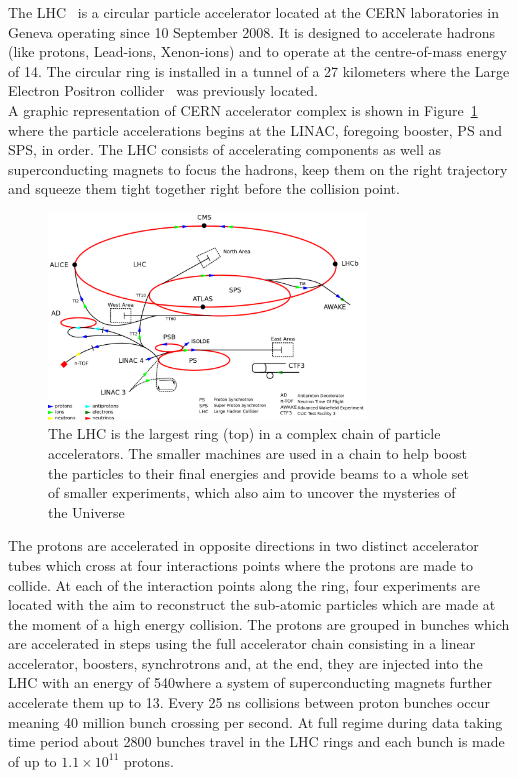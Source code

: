 The LHC~\cite{Brning2004LHCDR} is a circular particle accelerator
located at the CERN laboratories in Geneva operating since 10
September 2008. It is
designed to accelerate hadrons (like protons, Lead-ions, Xenon-ions) and to
operate at the centre-of-mass energy of 14\TeV.
The circular ring is installed in a tunnel of a 27 kilometers where
the Large Electron Positron collider~\cite{Lep:designReport} was
previously located.\\
A graphic representation of CERN accelerator
complex is shown in Figure~\ref{fig:cern} where the particle
accelerations begins at the LINAC, foregoing booster, PS and SPS, in
order. The LHC consists of accelerating components as well as
superconducting magnets to focus the hadrons, keep them on the right
trajectory and squeeze them tight together right before the
collision point. 

\begin{figure}[h]
\centering
\includegraphics[width=0.75\textwidth]{Figures/c2/Cern-accelerator-complex.png}
\vspace*{3mm}
\caption{The LHC is the largest ring (top) in a complex chain of particle accelerators. The smaller machines are used in a chain to help boost the particles to their final energies and provide beams to a whole set of smaller experiments, which also aim to uncover the mysteries of the Universe~\cite{Mobs:2197559}}
\label{fig:cern}
\end{figure}

The protons are accelerated in opposite directions in two distinct
accelerator tubes which cross at four interactions points where the
protons are made to collide. At each of the interaction points along the ring,
four experiments are located with the aim to reconstruct the
sub-atomic particles which are made at the moment of a high energy
collision. The protons are grouped in bunches which are
accelerated in steps using the full accelerator chain consisting in a linear
accelerator, boosters, synchrotrons and, at the end, they are injected
into the LHC with an energy of 540\GeV where a system of
superconducting magnets further accelerate them up to 13\TeV. Every
25 ns collisions between proton bunches occur meaning 40 million
bunch crossing per second. At full regime during data taking time
period about 2800 bunches travel in the LHC rings and each bunch is
made of up to $1.1\times10^{11}$ protons.

